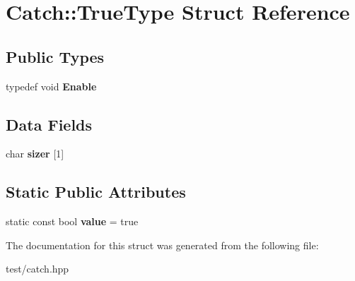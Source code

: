 \hypertarget{structCatch_1_1TrueType}{}\section{Catch\+:\+:True\+Type Struct Reference}
\label{structCatch_1_1TrueType}
\subsection*{Public Types}
\begin{DoxyCompactItemize}
\item 
typedef void {\bfseries Enable}\hypertarget{structCatch_1_1TrueType_a1c370b2ef39036c053357b868ef94a97}{}\label{structCatch_1_1TrueType_a1c370b2ef39036c053357b868ef94a97}

\end{DoxyCompactItemize}
\subsection*{Data Fields}
\begin{DoxyCompactItemize}
\item 
char {\bfseries sizer} \mbox{[}1\mbox{]}\hypertarget{structCatch_1_1TrueType_a8a7ed3be2e763d614e7d1f0cd18219d1}{}\label{structCatch_1_1TrueType_a8a7ed3be2e763d614e7d1f0cd18219d1}

\end{DoxyCompactItemize}
\subsection*{Static Public Attributes}
\begin{DoxyCompactItemize}
\item 
static const bool {\bfseries value} = true\hypertarget{structCatch_1_1TrueType_ac7b4114d6c6d3d4ff8d2df67f243d2be}{}\label{structCatch_1_1TrueType_ac7b4114d6c6d3d4ff8d2df67f243d2be}

\end{DoxyCompactItemize}


The documentation for this struct was generated from the following file\+:\begin{DoxyCompactItemize}
\item 
test/catch.\+hpp\end{DoxyCompactItemize}

